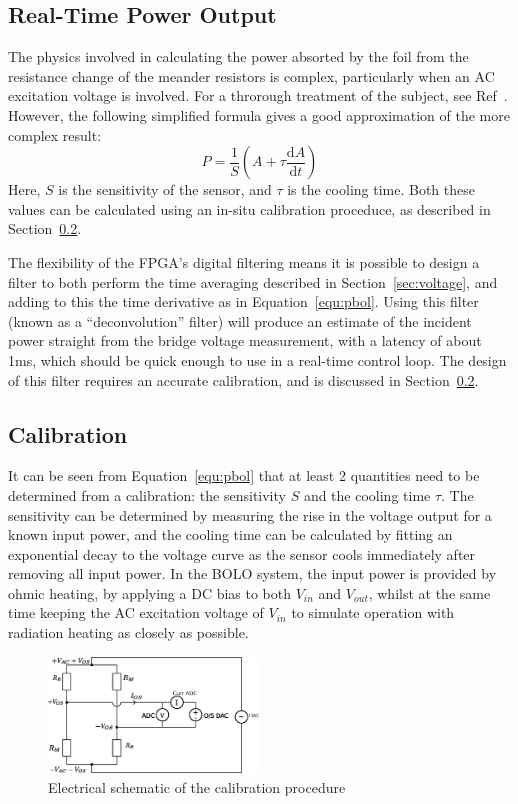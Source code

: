 \documentclass[12pt,a4paper]{article}
\begin{document}
\subsection{Real-Time Power Output}
\label{sec:rtpower}
The physics involved in calculating the power absorted by the foil from the resistance change of the meander resistors is complex, particularly when an AC
excitation voltage is involved. For a throrough treatment of the subject, see Ref~\cite{giannone-2002}. However, the following simplified formula gives a
good approximation of the more complex result:
\begin{equation}
  \label{equ:pbol}
  P = \frac{1}{S}\left(A + \tau \frac{\mathrm{d}A}{\mathrm{d}t}\right)
\end{equation}
Here, $S$ is the sensitivity of the sensor, and $\tau$ is the cooling time. Both these values can be calculated using an in-situ calibration proceduce, as
described in Section~\ref{sec:calibration}.

The flexibility of the FPGA's digital filtering means it is possible to design a filter to both perform the time averaging described in
Section~\ref{sec:voltage}, and adding to this the time derivative as in Equation~\ref{equ:pbol}. Using this filter (known as a ``deconvolution'' filter)
will produce an estimate of the incident power straight from the bridge voltage measurement, with a latency of about 1ms, which should be quick enough to
use in a real-time control loop. The design of this filter requires an accurate calibration, and is discussed in Section~\ref{sec:calibration}.

\subsection{Calibration}
\label{sec:calibration}
It can be seen from Equation~\ref{equ:pbol} that at least 2 quantities need to be determined from a calibration: the sensitivity $S$ and the cooling time
$\tau$. The sensitivity can be determined by measuring the rise in the voltage output for a known input power, and the cooling time can be calculated by
fitting an exponential decay to the voltage curve as the sensor cools immediately after removing all input power. In the BOLO system, the input power is
provided by ohmic heating, by applying a DC bias to both $V_{in}$ and $V_{out}$, whilst at the same time keeping the AC excitation voltage of $V_{in}$ to
simulate operation with radiation heating as closely as possible.

\begin{figure}
  \centering
  \includegraphics[width=0.5\textwidth]{calibration.eps}
  \caption{Electrical schematic of the calibration procedure\label{fig:calibration}}
\end{figure}
\end{document}
